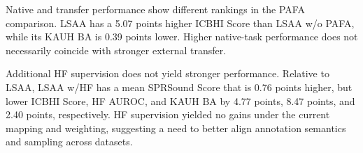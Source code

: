 Native and transfer performance show different rankings in the PAFA comparison. LSAA has a 5.07 points higher ICBHI Score than LSAA w/o PAFA, while its KAUH BA is 0.39 points lower. Higher native-task performance does not necessarily coincide with stronger external transfer.

\label{sec:hf_supervision}
Additional HF supervision does not yield stronger performance. Relative to LSAA, LSAA w/HF has a mean SPRSound Score that is 0.76 points higher, but lower ICBHI Score, HF AUROC, and KAUH BA by 4.77 points, 8.47 points, and 2.40 points, respectively. HF supervision yielded no gains under the current mapping and weighting, suggesting a need to better align annotation semantics and sampling across datasets.
\par
\endgroup
